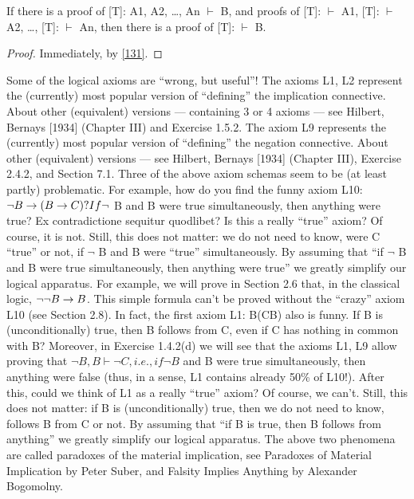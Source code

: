 \begin{cor}[]
If there is a proof of [T]: A1, A2, \ldots , An \(\vdash\) B, and proofs of [T]: \(\vdash\) A1, [T]: \(\vdash\) A2, \ldots , [T]: \(\vdash\)
An, then there is a proof of [T]: \(\vdash\) B.
\end{cor}
\begin{proof}
Immediately, by \cref{131}.
\end{proof}

Some of the logical axioms are ``wrong, but useful''!
The axioms L1, L2 represent the (currently) most popular version of ``defining'' the implication
connective. About other (equivalent) versions --- containing 3 or 4 axioms --- see Hilbert, Bernays [1934]
(Chapter III) and Exercise 1.5.2.
The axiom L9 represents the (currently) most popular version of ``defining'' the negation connective.
About other (equivalent) versions --- see Hilbert, Bernays [1934] (Chapter III), Exercise 2.4.2, and Section
7.1.
Three of the above axiom schemas seem to be (at least partly) problematic.
For example, how do you find the funny axiom L10: \(\neg B\rightarrow (B\rightarrow C)? If \neg\) B and B were true simultaneously,
then anything were true? Ex contradictione sequitur quodlibet? Is this a really ``true'' axiom? Of course, it
is not. Still, this does not matter: we do not need to know, were C ``true'' or not, if \(\neg\) B and B were ``true''
simultaneously. By assuming that ``if \(\neg\) B and B were true simultaneously, then anything were true'' we
greatly simplify our logical apparatus. For example, we will prove in Section 2.6 that, in the classical
logic, \(\neg \neg B\rightarrow B\). This simple formula can't be proved without the ``crazy'' axiom L10 (see Section 2.8).
In fact, the first axiom L1: B\IMPLIES (C\IMPLIES B) also is funny. If B is (unconditionally) true, then B follows from C,
even if C has nothing in common with B? Moreover, in Exercise 1.4.2(d) we will see that the axioms L1,
L9 allow proving that \(\neg B, B \vdash \neg C, i.e., if \neg B\) and B were true simultaneously, then anything were false
(thus, in a sense, L1 contains already 50\% of L10!). After this, could we think of L1 as a really ``true''
axiom? Of course, we can't. Still, this does not matter: if B is (unconditionally) true, then we do not need
to know, follows B from C or not. By assuming that ``if B is true, then B follows from anything'' we
greatly simplify our logical apparatus.
The above two phenomena are called paradoxes of the material implication, see Paradoxes of Material
Implication by Peter Suber, and Falsity Implies Anything by Alexander Bogomolny.

